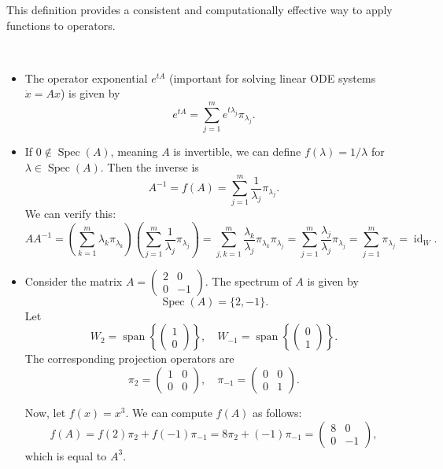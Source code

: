 This definition provides a consistent and computationally effective way to apply functions to operators.
\begin{example}\,
\begin{itemize}
    \item The operator exponential $e^{tA}$ (important for solving linear ODE systems $\dot{x}=Ax$) is given by 
    \[e^{tA} = \sum_{j=1}^m e^{t\lambda_j} \pi_{\lambda_j}.\]
    \item If $0 \notin \operatorname{Spec}(A)$, meaning $A$ is invertible, we can define $f(\lambda) = 1/\lambda$ for $\lambda \in \operatorname{Spec}(A)$. Then the inverse is 
    \[A^{-1} = f(A) = \sum_{j=1}^m \frac{1}{\lambda_j} \pi_{\lambda_j}.\] 
    We can verify this: 
    \[A A^{-1} = (\sum_{k=1}^m \lambda_k \pi_{\lambda_k})(\sum_{j=1}^m \frac{1}{\lambda_j} \pi_{\lambda_j}) = \sum_{j,k=1}^m \frac{\lambda_k}{\lambda_j} \pi_{\lambda_k} \pi_{\lambda_j} = \sum_{j=1}^m \frac{\lambda_j}{\lambda_j} \pi_{\lambda_j} = \sum_{j=1}^m \pi_{\lambda_j} = \operatorname{id}_W.\]
    \item Consider the matrix $A = \begin{pmatrix} 2 & 0 \\ 0 & -1 \end{pmatrix}$. The spectrum of $A$ is given by 
    \[
    \operatorname{Spec}(A) = \{2, -1\}.
    \]
    Let 
    \[
    W_2 = \operatorname{span}\left\{ \begin{pmatrix} 1 \\ 0 \end{pmatrix} \right\}, \quad W_{-1} = \operatorname{span}\left\{ \begin{pmatrix} 0 \\ 1 \end{pmatrix} \right\}.
    \]
    The corresponding projection operators are
    \[
    \pi_2 = \begin{pmatrix} 1 & 0 \\ 0 & 0 \end{pmatrix}, \quad \pi_{-1} = \begin{pmatrix} 0 & 0 \\ 0 & 1 \end{pmatrix}.
    \]
    
    Now, let $f(x) = x^3$. We can compute $f(A)$ as follows:
    \[
    f(A) = f(2)\pi_2 + f(-1)\pi_{-1} = 8\pi_2 + (-1)\pi_{-1} = \begin{pmatrix} 8 & 0 \\ 0 & -1 \end{pmatrix},
    \]
    which is equal to $A^3$.
    

\end{itemize}
\end{example}
